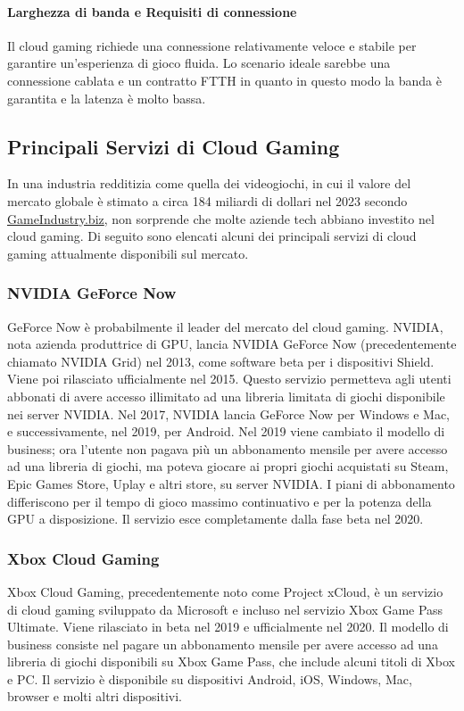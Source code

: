 \documentclass[12pt,a4paper,openright,twoside]{book}
\begin{document}
\paragraph{Larghezza di banda e Requisiti di connessione} Il cloud gaming richiede una connessione relativamente veloce e stabile per garantire un'esperienza di gioco fluida. Lo scenario ideale sarebbe una connessione cablata e un contratto FTTH in quanto in questo modo la banda è garantita e la latenza è molto bassa.

\subsection{Principali Servizi di Cloud Gaming}
In una industria redditizia come quella dei videogiochi, in cui il valore del mercato globale è stimato a circa 184 miliardi di dollari nel 2023 secondo \href{https://www.gamesindustry.biz/gamesindustrybiz-presents-the-year-in-number-2023}{GameIndustry.biz}, non sorprende che molte aziende tech abbiano investito nel cloud gaming. Di seguito sono elencati alcuni dei principali servizi di cloud gaming attualmente disponibili sul mercato.

\subsubsection{NVIDIA GeForce Now}
GeForce Now è probabilmente il leader del mercato del cloud gaming. NVIDIA, nota azienda produttrice di GPU, lancia NVIDIA GeForce Now (precedentemente chiamato NVIDIA Grid) nel 2013, come software beta per i dispositivi Shield. Viene poi rilasciato ufficialmente nel 2015. Questo servizio permetteva agli utenti abbonati di avere accesso illimitato ad una libreria limitata di giochi disponibile nei server NVIDIA.
Nel 2017, NVIDIA lancia GeForce Now per Windows e Mac, e successivamente, nel 2019, per Android. Nel 2019 viene cambiato il modello di business; ora l'utente non pagava più un abbonamento mensile per avere accesso ad una libreria di giochi, ma poteva giocare ai propri giochi acquistati su Steam, Epic Games Store, Uplay e altri store, su server NVIDIA. I piani di abbonamento differiscono per il tempo di gioco massimo continuativo e per la potenza della GPU a disposizione.
Il servizio esce completamente dalla fase beta nel 2020.

\subsubsection{Xbox Cloud Gaming}
Xbox Cloud Gaming, precedentemente noto come Project xCloud, è un servizio di cloud gaming sviluppato da Microsoft e incluso nel servizio Xbox Game Pass Ultimate. Viene rilasciato in beta nel 2019 e ufficialmente nel 2020. Il modello di business consiste nel pagare un abbonamento mensile per avere accesso ad una libreria di giochi disponibili su Xbox Game Pass, che include alcuni titoli di Xbox e PC. Il servizio è disponibile su dispositivi Android, iOS, Windows, Mac, browser e molti altri dispositivi.
\end{document}
